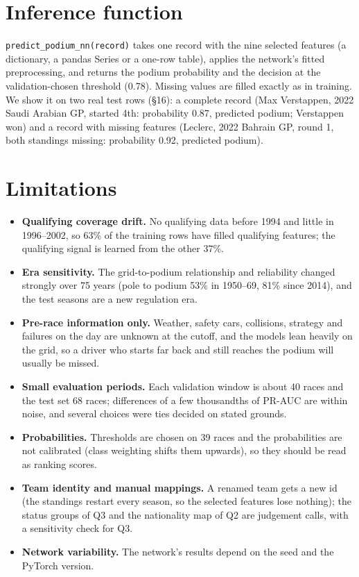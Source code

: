 \documentclass[10pt,a4paper]{article}
\newcommand{\code}[1]{\texttt{#1}}
\begin{document}
\section{Inference function}

\code{predict\_podium\_nn(record)} takes one record with the nine selected features (a dictionary, a pandas Series or a one-row table), applies the network's fitted preprocessing, and returns the podium probability and the decision at the validation-chosen threshold (0.78). Missing values are filled exactly as in training. We show it on two real test rows (\S16): a complete record (Max Verstappen, 2022 Saudi Arabian GP, started 4th: probability 0.87, predicted podium; Verstappen won) and a record with missing features (Leclerc, 2022 Bahrain GP, round 1, both standings missing: probability 0.92, predicted podium).

\section{Limitations}

\begin{itemize}
\item \textbf{Qualifying coverage drift.} No qualifying data before 1994 and little in 1996--2002, so 63\% of the training rows have filled qualifying features; the qualifying signal is learned from the other 37\%.
\item \textbf{Era sensitivity.} The grid-to-podium relationship and reliability changed strongly over 75 years (pole to podium 53\% in 1950--69, 81\% since 2014), and the test seasons are a new regulation era.
\item \textbf{Pre-race information only.} Weather, safety cars, collisions, strategy and failures on the day are unknown at the cutoff, and the models lean heavily on the grid, so a driver who starts far back and still reaches the podium will usually be missed.
\item \textbf{Small evaluation periods.} Each validation window is about 40 races and the test set 68 races; differences of a few thousandths of PR-AUC are within noise, and several choices were ties decided on stated grounds.
\item \textbf{Probabilities.} Thresholds are chosen on 39 races and the probabilities are not calibrated (class weighting shifts them upwards), so they should be read as ranking scores.
\item \textbf{Team identity and manual mappings.} A renamed team gets a new id (the standings restart every season, so the selected features lose nothing); the status groups of Q3 and the nationality map of Q2 are judgement calls, with a sensitivity check for Q3.
\item \textbf{Network variability.} The network's results depend on the seed and the PyTorch version.
\end{itemize}
\end{document}
